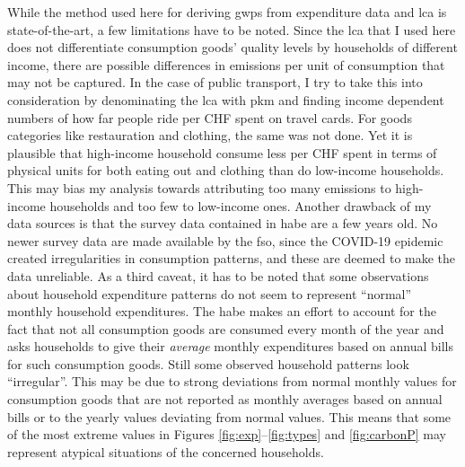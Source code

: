 \documentclass[a4paper,11pt,abstract=true]{scrartcl}
\begin{document}

While the method used here for deriving \acp{gwp} from expenditure data and \ac{lca} is state-of-the-art, a few limitations have to be noted.
Since the \ac{lca} that I used here does not differentiate consumption goods' quality levels by households of different income, there are possible differences in emissions per unit of consumption that may not be captured.
In the case of public transport, I try to take this into consideration by denominating the \ac{lca} with \ac{pkm} and finding income dependent numbers of how far people ride per CHF spent on travel cards.
For goods categories like restauration and clothing, the same was not done.
Yet it is plausible that high-income household consume less per CHF spent in terms of physical units for both eating out and clothing than do low-income households.
This may bias my analysis towards attributing too many emissions to high-income households and too few to low-income ones.
Another drawback of my data sources is that the survey data contained in \ac{habe} are a few years old.
No newer survey data are made available by the \ac{fso}, since the COVID-19 epidemic created irregularities in consumption patterns, and these are deemed to make the data unreliable.
As a third caveat, it has to be noted that some observations about household expenditure patterns do not seem to represent ``normal'' monthly household expenditures.
The \ac{habe} makes an effort to account for the fact that not all consumption goods are consumed every month of the year and asks households to give their \emph{average} monthly expenditures based on annual bills for such consumption goods.
Still some observed household patterns look ``irregular''.
This may be due to strong deviations from normal monthly values for consumption goods that are not reported as monthly averages based on annual bills or to  the yearly values deviating from normal values.
This means that some of the most extreme values in Figures \ref{fig:exp}--\ref{fig:types} and \ref{fig:carbonP} may represent atypical situations of the concerned households.
\end{document}
